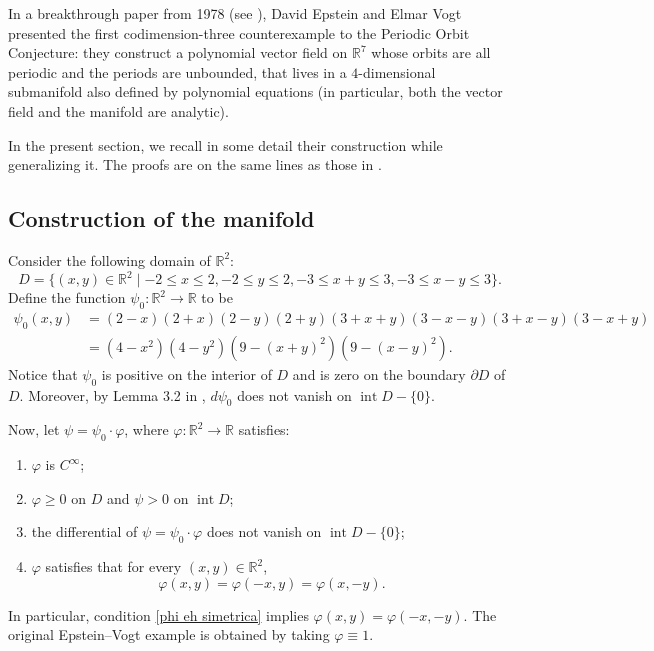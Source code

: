 \documentclass[11pt,reqno]{amsart}
\theoremstyle{plain}
\theoremstyle{definition}
\theoremstyle{remark}
\theoremstyle{plain}
\numberwithin{equation}{section}
\newcommand{\R}{\mathbb{R}}
\DeclareMathOperator{\interior}{int}
\begin{document}
In a breakthrough paper from 1978 (see \cite{EV78}), David Epstein and Elmar Vogt presented the first codimension-three counterexample to the Periodic Orbit Conjecture: they construct a polynomial vector field on $\R^{7}$ whose orbits are all periodic and the periods are unbounded, that lives in a $4$-dimensional submanifold also defined by polynomial equations (in particular, both the vector field and the manifold are analytic). 
							
							In the present section, we recall in some detail their construction while generalizing it. The proofs are on the same lines as those in \cite{EV78}.
							\subsection{Construction of the manifold}
							
							Consider the following domain of $\R^{2}$: \begin{equation}\label{octogonal domain} D=\{(x,y)\in \R^{2} \mid -2\leq x\leq 2, -2\leq y\leq 2, -3\leq x+y\leq 3, -3\leq x-y\leq 3\}.\end{equation} Define the function $\psi_{0}\colon \R^{2}\to \R$ to be \begin{align}\label{psi_0}
								\psi_{0}(x,y)&=(2-x)(2+x)(2-y)(2+y)(3+x+y)(3-x-y)(3+x-y)(3-x+y)\nonumber \\&=(4-x^2)(4-y^2)(9-(x+y)^2)(9-(x-y)^2) .\end{align} Notice that $\psi_{0}$ is positive on the interior of $D$ and is zero on the boundary $\partial D$ of $D$. Moreover, by Lemma 3.2 in \cite{EV78}, $d\psi_{0}$ does not vanish on $\interior{D}-\{0\}$.
							
							Now, let $\psi=\psi_{0}\cdot \varphi$, where $\varphi\colon \R^{2}\to \R$ satisfies: \begin{enumerate}[label=\((\roman*)\)]
								\item \label{phi eh c infinito} $\varphi$ is $C^{\infty}$;
								\item \label{phi eh positiva} $\varphi\geq 0$ on $D$ and $\psi>0$ on $\interior{D}$;
								\item \label{psi é submersao} the differential of $\psi=\psi_{0}\cdot \varphi$ does not vanish on $\interior{D}-\{0\}$;
								\item \label{phi eh simetrica} $\varphi$ satisfies that for every $(x,y)\in \R^{2}$, $$\varphi(x,y)=\varphi(-x,y)=\varphi(x,-y).$$
							\end{enumerate} In particular, condition \ref{phi eh simetrica} implies $\varphi(x,y)=\varphi(-x,-y)$. The original Epstein--Vogt example is obtained by taking $\varphi\equiv1$.
							
\end{document}
